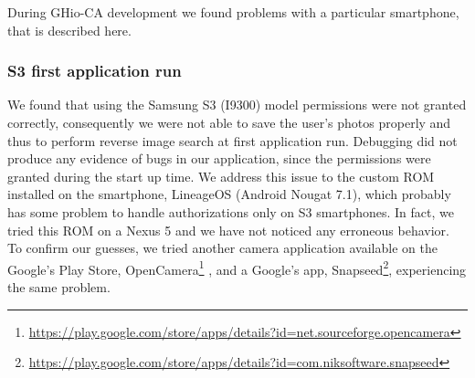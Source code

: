 During GHio-CA development we found problems with a particular smartphone, 
that is described here.

\subsubsection{S3 first application run}

We found that using the Samsung S3 (I9300) model permissions were not granted correctly, consequently we were not able to save the user's photos properly and thus to perform reverse image search at first application run. Debugging did not produce any evidence of bugs in our application, since the permissions 
were granted during the start up time.
We address this issue to the custom ROM installed on the smartphone, LineageOS 
(Android Nougat 7.1), which probably has some problem to handle authorizations only on S3 smartphones. In fact, we tried this ROM on a Nexus 5 and we have not noticed any erroneous behavior. To confirm our guesses, we tried another camera application available on the Google's Play Store, OpenCamera\footnote{\url{https://play.google.com/store/apps/details?id=net.sourceforge.opencamera}}
, and a Google's app, Snapseed\footnote{\url{https://play.google.com/store/apps/details?id=com.niksoftware.snapseed}}, experiencing the same problem.